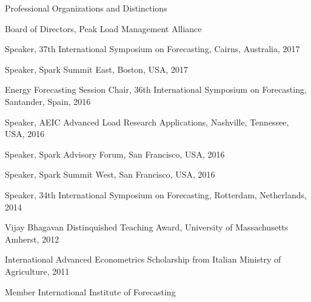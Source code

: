 \documentclass{resume} %
\begin{document}
\begin{rSection}{Professional Organizations and Distinctions}

\item Board of Directors, Peak Load Management Alliance
\item Speaker, 37th International Symposium on Forecasting, Cairns, Australia, 2017
\item Speaker, Spark Summit East, Boston, USA, 2017
\item Energy Forecasting Session Chair, 36th International Symposium on Forecasting, Santander, Spain, 2016
\item Speaker, AEIC Advanced Load Research Applications, Nashville, Tennessee, USA, 2016
\item Speaker, Spark Advisory Forum, San Francisco, USA, 2016
\item Speaker, Spark Summit West, San Francisco, USA, 2016
\item Speaker, 34th International Symposium on Forecasting, Rotterdam, Netherlands, 2014
\item Vijay Bhagavan Distinquished Teaching Award, University of Massachusetts Amherst, 2012
\item International Advanced Econometrics Scholarship from Italian Ministry of Agriculture, 2011
\item Member International Institute of Forecasting

\end{rSection}
\end{document}
